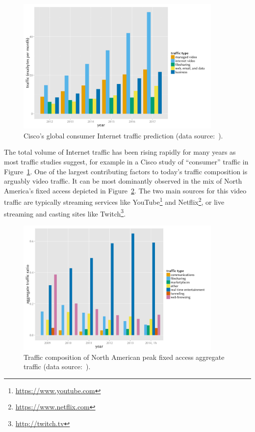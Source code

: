 \begin{figure}[htb]
	\centering
	\includegraphics[width=0.9\textwidth]{images/r-cisco-vni-2013.pdf}
	\caption{Cisco's global consumer Internet traffic prediction (data source:~\cite{cisco2013VNI}).}
\label{c1:fig:traffic-cisco}
\end{figure}

The total volume of Internet traffic has been rising rapidly for many years as most traffic studies suggest, for example in a Cisco study of ``consumer'' traffic in Figure~\ref{c1:fig:traffic-cisco}. One of the largest contributing factors to today's traffic composition is arguably video traffic. It can be most dominantly observed in the mix of North America's fixed access depicted in Figure~\ref{c1:fig:traffic-netvine-fixed}. The two main sources for this video traffic are typically streaming services like YouTube\footnote{\url{https://www.youtube.com}} and Netflix\footnote{\url{https://www.netflix.com}}, or live streaming and casting sites like Twitch\footnote{\url{http://twitch.tv}}. 

\begin{figure}[htb]
	\centering
	\includegraphics[width=0.9\textwidth]{images/r-netvine-phenomena-fixed.pdf}
	\caption{Traffic composition of North American peak fixed access aggregate traffic (data source:~\cite{sandvine_internetphenomena}).}
\label{c1:fig:traffic-netvine-fixed}
\end{figure}

